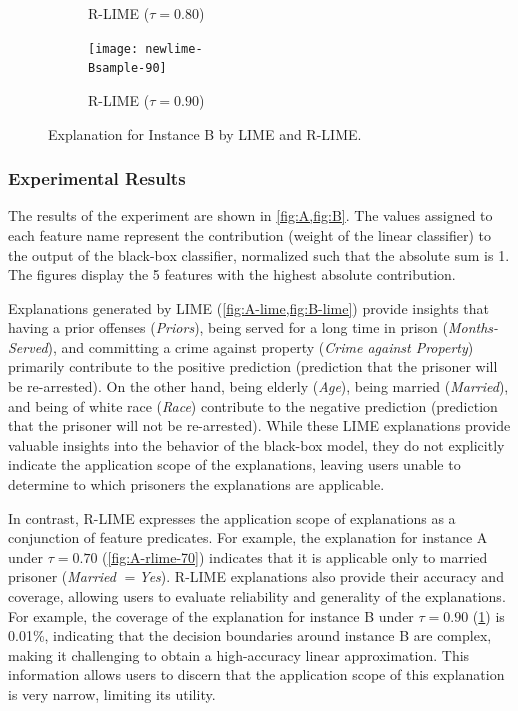 \documentclass[runningheads]{llncs}
\begin{document}
{{\begin{figure}[p]
\begin{subfigure}[t]{\imgwidth}
          \caption{R-LIME ($\tau=0.80$)}
        \end{subfigure}
        \begin{subfigure}[t]{\imgwidth}
          \hspace{-0.8em}
          \texttt{[image: newlime-\\Bsample-90]}
          \caption{R-LIME ($\tau=0.90$)}\label{fig:B-rlime-90}
        \end{subfigure}
        \caption[Explanation for Instance B by LIME and R-LIME]{%
          Explanation for Instance B by LIME and R-LIME\@.
        }\label{fig:B}
      \end{figure}
    }
  }
\subsubsection{Experimental Results}
The results of the experiment are shown in \cref{fig:A,fig:B}.
The values assigned to each feature name represent the contribution
(weight of the linear classifier)
to the output of the black-box classifier,
normalized such that the absolute sum is 1.
The figures display the 5 features with the highest absolute contribution.

Explanations generated by LIME (\cref{fig:A-lime,fig:B-lime}) provide insights
that having a prior offenses (\emph{Priors}),
being served for a long time in prison (\emph{Months-Served}),
and committing a crime against property (\emph{Crime against Property})
primarily contribute to the positive prediction
(prediction that the prisoner will be re-arrested).
On the other hand,
being elderly (\emph{Age}), being married (\emph{Married}),
and being of white race (\emph{Race}) contribute to the negative prediction
(prediction that the prisoner will not be re-arrested).
While these LIME explanations provide valuable insights into the behavior of
the black-box model,
they do not explicitly indicate the application scope of the explanations,
leaving users unable to determine to which prisoners the explanations are applicable.

In contrast, R-LIME expresses the application scope of explanations
as a conjunction of feature predicates.
For example, the explanation for instance A
under $\tau=0.70$ (\cref{fig:A-rlime-70}) indicates that it is applicable
only to married prisoner (\emph{Married} $=$\emph{Yes}).
R-LIME explanations also provide their accuracy and coverage,
allowing users to evaluate reliability and generality of the explanations.
For example, the coverage of the explanation for instance B under $\tau=0.90$
(\cref{fig:B-rlime-90}) is 0.01\%,
indicating that the decision boundaries around instance B are complex,
making it challenging to obtain a high-accuracy linear approximation.
This information allows users to discern that
the application scope of this explanation is very narrow, limiting its utility.
\end{document}
